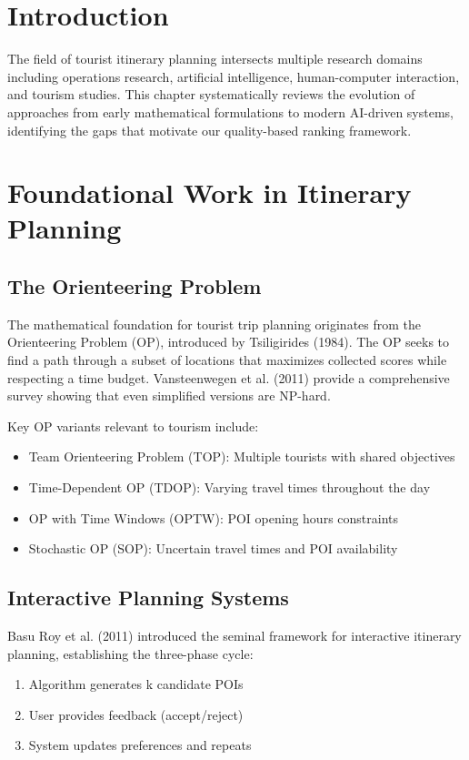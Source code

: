 
\section{Introduction}

The field of tourist itinerary planning intersects multiple research domains including operations research, artificial intelligence, human-computer interaction, and tourism studies. This chapter systematically reviews the evolution of approaches from early mathematical formulations to modern AI-driven systems, identifying the gaps that motivate our quality-based ranking framework.

\section{Foundational Work in Itinerary Planning}

\subsection{The Orienteering Problem}

The mathematical foundation for tourist trip planning originates from the Orienteering Problem (OP), introduced by Tsiligirides (1984). The OP seeks to find a path through a subset of locations that maximizes collected scores while respecting a time budget. Vansteenwegen et al. (2011) provide a comprehensive survey showing that even simplified versions are NP-hard.

Key OP variants relevant to tourism include:
\begin{itemize}
    \item Team Orienteering Problem (TOP): Multiple tourists with shared objectives
    \item Time-Dependent OP (TDOP): Varying travel times throughout the day
    \item OP with Time Windows (OPTW): POI opening hours constraints
    \item Stochastic OP (SOP): Uncertain travel times and POI availability
\end{itemize}

\subsection{Interactive Planning Systems}

Basu Roy et al. (2011) introduced the seminal framework for interactive itinerary planning, establishing the three-phase cycle:
\begin{enumerate}
    \item Algorithm generates k candidate POIs
    \item User provides feedback (accept/reject)
    \item System updates preferences and repeats
\end{enumerate}

